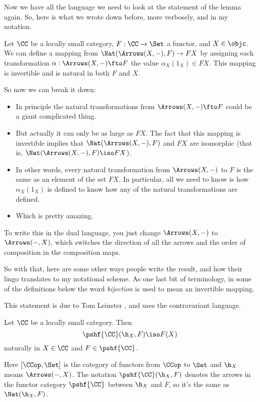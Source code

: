 Now we have all the language we need to look at the statement of the lemma again. So, here
is what we wrote down before, more verbosely, and in my notation.

\begin{lemma}[Yoneda]\label{yoneda} Let $\CC$ be a locally small category, $F:\CC \to
\Set$ a functor, and $X \in \objc$. We can define a mapping from $\Nat(\Arrows(X, -),F)
\to FX$ by assigning each transformation $\alpha: \Arrows(X, -) \fto F$ the value
$\alpha_X(1_X) \in FX$. This mapping is invertible and is natural in both $F$ and $X$.
\end{lemma}
\noindent
So now we can break it down:
\begin{itemize}
\item In principle the natural transformations from $\Arrows(X, -) \fto F$ could be a
giant complicated thing.
\item But actually it can only be as large as $FX$. The fact that this mapping is
invertible implies that $\Nat(\Arrows(X, -),F)$ and  $FX$ are isomorphic (that is,
$\Nat(\Arrows(X, -),F) \iso FX$).
\item In other words, every natural transformation from $\Arrows(X, -)$ to $F$ is the same
as an element of the set $FX$. In particular, all we need to know is how $\alpha_X(1_X)$
is defined to know how any of the natural transformations are defined.
\item Which is pretty amazing.
\end{itemize}
To write this in the dual language, you just change $\Arrows(X, -)$ to $\Arrows(-, X)$,
which switches the direction of all the arrows and the order of composition in the
composition maps.

So with that, here are some other ways people write the result, and how their lingo
translates to my notational scheme. As one last bit of terminology, in some of the
definitions below the word {\it bijection} is used to mean an invertible mapping.

\pg
This statement is due to Tom Leinster \cite{Leinster}, and uses the contravariant
language.

\begin{lemma}[Yoneda]   
\label{yoneda-leinster}
Let $\CC$ be a locally small category.  Then
%
$$
\pshf{\CC}(\h_X, F)
\iso
F(X)
$$
%
naturally in $X \in \CC$ and $F \in \pshf{\CC}$.  
\end{lemma}
\noindent
Here $[\CCop, \Set]$ is the category of functors from $\CCop$ to $\Set$ and 
$\h_X$ means $\Arrows(-,X)$.
The notation $\pshf{\CC}(\h_X, F)$ denotes the arrows in the functor
category $\pshf{\CC}$ between $\h_X$ and $F$, so it's the same as $\Nat(\h_X, F)$.

